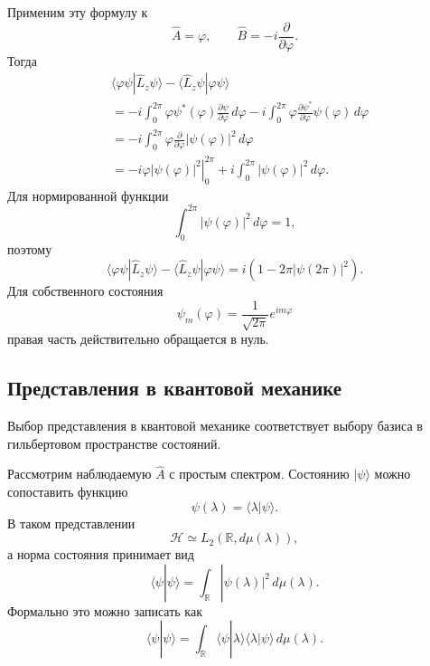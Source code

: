 \documentclass[12pt,a4paper]{article}
\begin{document}
Применим эту формулу к
\[
    \hat A=\varphi,
    \qquad
    \hat B=-i\frac{\partial}{\partial\varphi}.
\]
Тогда
\begin{align*}
    &
    \langle\varphi\psi|\hat L_z\psi\rangle
    -
    \langle\hat L_z\psi|\varphi\psi\rangle
    \\
    &=
    -i
    \int_0^{2\pi}
        \varphi\psi^*(\varphi)
        \frac{\partial\psi}{\partial\varphi}\,d\varphi
    -
    i
    \int_0^{2\pi}
        \varphi
        \frac{\partial\psi^*}{\partial\varphi}
        \psi(\varphi)\,d\varphi
    \\
    &=
    -i
    \int_0^{2\pi}
        \varphi
        \frac{\partial}{\partial\varphi}
        |\psi(\varphi)|^2\,d\varphi
    \\
    &=
    -i
    \left.
        \varphi|\psi(\varphi)|^2
    \right|_0^{2\pi}
    +
    i
    \int_0^{2\pi}
        |\psi(\varphi)|^2\,d\varphi.
\end{align*}
Для нормированной функции
\[
    \int_0^{2\pi}|\psi(\varphi)|^2\,d\varphi=1,
\]
поэтому
\[
    \boxed{
    \langle\varphi\psi|\hat L_z\psi\rangle
    -
    \langle\hat L_z\psi|\varphi\psi\rangle
    =
    i\left(
        1-2\pi|\psi(2\pi)|^2
    \right)
    }.
\]
Для собственного состояния
\[
    \psi_m(\varphi)
    =
    \frac{1}{\sqrt{2\pi}}e^{im\varphi}
\]
правая часть действительно обращается в нуль.


\subsection{Представления в квантовой механике}

Выбор представления в квантовой механике соответствует выбору базиса
в гильбертовом пространстве состояний.

Рассмотрим наблюдаемую $\hat A$ с простым спектром. Состоянию
$|\psi\rangle$ можно сопоставить функцию
\[
    \boxed{
        \psi(\lambda)
        =
        \langle\lambda|\psi\rangle
    }.
\]
В таком представлении
\[
    \mathcal H
    \simeq
    L_2(\mathbb R,d\mu(\lambda)),
\]
а норма состояния принимает вид
\[
    \boxed{
        \langle\psi|\psi\rangle
        =
        \int_{\mathbb R}
            |\psi(\lambda)|^2\,d\mu(\lambda)
    }.
\]
Формально это можно записать как
\[
    \langle\psi|\psi\rangle
    =
    \int_{\mathbb R}
        \langle\psi|\lambda\rangle
        \langle\lambda|\psi\rangle
        \,d\mu(\lambda).
\]
\end{document}
